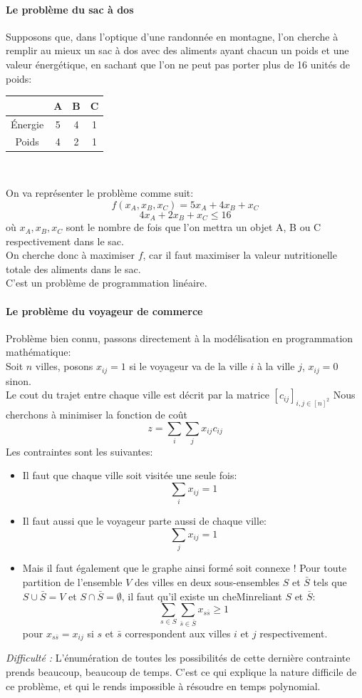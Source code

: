 \documentclass[a4paper]{report}
\theoremstyle{definition}
\theoremstyle{remark}
\theoremstyle{plain}
\begin{document}
\paragraph{Le problème du sac à dos} Supposons que, dans l'optique d'une
randonnée en montagne, l'on cherche à remplir au mieux un sac à dos avec des
aliments ayant chacun un poids et une valeur énergétique, en sachant que l'on ne
peut pas porter plus de 16 unités de poids:
\begin{center}
\begin{tabular}{|c|c|c|c|}
\hline
 & A & B & C \\
\hline
Énergie & 5 & 4 & 1 \\
\hline
Poids & 4 & 2 & 1 \\
\hline
\end{tabular}
\\
\end{center}
On va représenter le problème comme suit:
\[f(x_A, x_B, x_C) =5x_A + 4x_B + x_C\]
\[4x_A + 2x_B + x_C \le 16\]
où \(x_A,x_B,x_C\) sont le nombre de fois que l'on mettra un objet A, B ou C
respectivement dans le sac.\\
On cherche donc à maximiser \(f\), car il faut maximiser la valeur nutritionelle
totale des aliments dans le sac.\\
C'est un problème de programmation linéaire.
\paragraph{Le problème du voyageur de commerce} Problème bien connu, passons
directement à la modélisation en programmation mathématique:\\
Soit \(n\) villes, posons \(x_{ij} = 1\) si le voyageur va de la ville \(i\) à
la ville \(j\), \(x_{ij} = 0\) sinon.\\
Le cout du trajet entre chaque ville est décrit par la matrice
\([c_{ij}]_{i,j\in[n]^2}\)
Nous cherchons à minimiser la fonction de coût
\[z=\sum_i\sum_j x_{ij}c_{ij}\]
Les contraintes sont les suivantes:
\begin{itemize}
	\item Il faut que chaque ville soit visitée une seule fois:
		\[\sum_i x_{ij} = 1\]
	\item Il faut aussi que le voyageur parte aussi de chaque ville:
		\[\sum_j x_{ij} = 1\]
	\item Mais il faut également que le graphe ainsi formé soit connexe ! Pour
		toute partition de l'ensemble \(V\) des villes en deux sous-ensembles
		\(S\) et \(\bar S\) tels que \(S\cup\bar S=V\) et
		\(S\cap\bar S=\emptyset\), il faut qu'il existe un cheMin\;reliant \(S\)
		et \(\bar S\):
		\[\sum_{s\in S}\sum_{\bar s\in\bar S}x_{s\bar s}\ge 1\]
		pour \(x_{s\bar s}=x_{ij}\) si \(s\) et \(\bar s\) correspondent aux
		villes \(i\) et \(j\) respectivement.\\
\end{itemize}
\emph{Difficulté :} L'énumération de toutes les possibilités de cette dernière
contrainte prends beaucoup, beaucoup de temps. C'est ce qui explique la nature
difficile de ce problème, et qui le rends impossible à résoudre en temps
polynomial.
\end{document}
